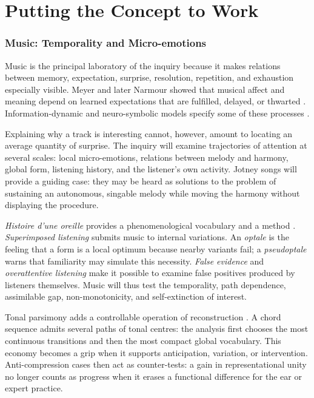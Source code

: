 \documentclass[11pt,a4paper]{article}
\begin{document}
\part{Putting the Concept to Work}

\section{Music: Temporality and Micro-emotions}

Music is the principal laboratory of the inquiry because it makes relations
between memory, expectation, surprise, resolution, repetition, and exhaustion
especially visible. Meyer and later Narmour showed that musical affect and
meaning depend on learned expectations that are fulfilled, delayed, or thwarted
\parencite{meyer1956emotion,narmour1990basic,narmour1992complexity}.
Information-dynamic and neuro-symbolic models specify some of these processes
\parencite{abdallah2009information,berger1999expectations,gang1999unified}.

Explaining why a track is interesting cannot, however, amount to locating an
average quantity of surprise. The inquiry will examine trajectories of
attention at several scales: local micro-emotions, relations between melody and
harmony, global form, listening history, and the listener's own activity.
Jotney songs will provide a guiding case: they may be heard as solutions to the
problem of sustaining an autonomous, singable melody while moving the harmony
without displaying the procedure.

\emph{Histoire d'une oreille} provides a phenomenological vocabulary and a
method \parencite{pachet2018oreille}. \emph{Superimposed listening} submits
music to internal variations. An \emph{optale} is the feeling that a form is a
local optimum because nearby variants fail; a \emph{pseudoptale} warns that
familiarity may simulate this necessity. \emph{False evidence} and
\emph{overattentive listening} make it possible to examine false positives
produced by listeners themselves. Music will thus test the temporality, path
dependence, assimilable gap, non-monotonicity, and self-extinction of interest.

Tonal parsimony adds a controllable operation of reconstruction
\parencite{pachet2026tonalparsimony}. A chord sequence admits several paths of
tonal centres: the analysis first chooses the most continuous transitions and
then the most compact global vocabulary. This economy becomes a grip when it
supports anticipation, variation, or intervention. Anti-compression cases then
act as counter-tests: a gain in representational unity no longer counts as
progress when it erases a functional difference for the ear or expert practice.
\end{document}
